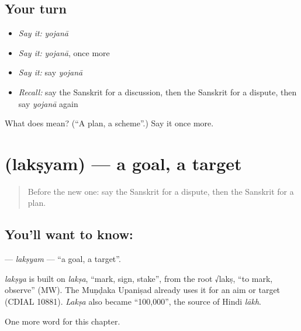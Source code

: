 \subsection*{Your turn}
\begin{itemize}
\raggedright
  \item \emph{Say it:} \emph{yojanā}
  \item \emph{Say it:} \emph{yojanā}, once more
  \item \emph{Say it:} say \emph{yojanā}
  \item \emph{Recall:} say the Sanskrit for a discussion, then the Sanskrit for a dispute, then say \emph{yojanā} again
\end{itemize}

\begin{tcolorbox}[breakable,colback=teal!4,colframe=teal!35!black,title={Before you move on}]
What does  mean? (\textquotedblleft{}A plan, a scheme\textquotedblright{}.) Say it once more.
\end{tcolorbox}
\section[\texorpdfstring{\sk{लक्ष्यम्} (lakṣyam)}{लक्ष्यम् (lakṣyam)}]{ (lakṣyam) — a goal, a target}

\label{lesson:SA-C201-laksyam}



\begin{quote}
Before the new one: say the Sanskrit for a dispute, then the Sanskrit for a plan.
\end{quote}

\subsection*{You'll want to know: }
\textbf{} — \emph{lakṣyam} — \textquotedblleft{}a goal, a target\textquotedblright{}.

\begin{cousinweb}
\emph{lakṣya} is built on \emph{lakṣa}, \textquotedblleft{}mark, sign, stake\textquotedblright{}, from the root √lakṣ, \textquotedblleft{}to mark, observe\textquotedblright{} (MW). The Muṇḍaka Upaniṣad already uses it for an aim or target (CDIAL 10881). \emph{Lakṣa} also became \textquotedblleft{}100,000\textquotedblright{}, the source of Hindi \emph{lākh}.
\end{cousinweb}

\begin{grammarlens}[title={What you've built}]
One more word for this chapter.
\end{grammarlens}

